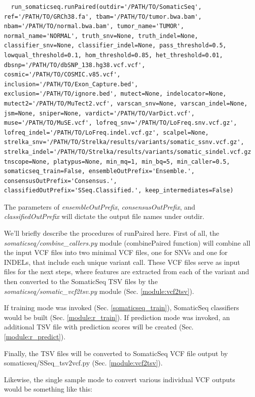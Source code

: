 \documentclass[10pt,letterpaper]{article}
\begin{document}
\begin{sloppypar}
\begin{lstlisting}
  run_somaticseq.runPaired(outdir='/PATH/TO/SomaticSeq', ref='/PATH/TO/GRCh38.fa', tbam='/PATH/TO/tumor.bwa.bam', nbam='/PATH/TO/normal.bwa.bam', tumor_name='TUMOR', normal_name='NORMAL', truth_snv=None, truth_indel=None, classifier_snv=None, classifier_indel=None, pass_threshold=0.5, lowqual_threshold=0.1, hom_threshold=0.85, het_threshold=0.01, dbsnp='/PATH/TO/dbSNP_138.hg38.vcf.vcf', cosmic='/PATH/TO/COSMIC.v85.vcf', inclusion='/PATH/TO/Exon_Capture.bed', exclusion='/PATH/TO/ignore.bed', mutect=None, indelocator=None, mutect2='/PATH/TO/MuTect2.vcf', varscan_snv=None, varscan_indel=None, jsm=None, sniper=None, vardict='/PATH/TO/VarDict.vcf', muse='/PATH/TO/MuSE.vcf', lofreq_snv='/PATH/TO/LoFreq.snv.vcf.gz', lofreq_indel='/PATH/TO/LoFreq.indel.vcf.gz', scalpel=None, strelka_snv='/PATH/TO/Strelka/results/variants/somatic_ssnv.vcf.gz', strelka_indel='/PATH/TO/Strelka/results/variants/somatic_sindel.vcf.gz', tnscope=None, platypus=None, min_mq=1, min_bq=5, min_caller=0.5, somaticseq_train=False, ensembleOutPrefix='Ensemble.', consensusOutPrefix='Consensus.', classifiedOutPrefix='SSeq.Classified.', keep_intermediates=False)
\end{lstlisting}

The parameters of \emph{ensembleOutPrefix}, \emph{consensusOutPrefix}, and \emph{classifiedOutPrefix} will dictate the output file names under outdir.


We'll briefly describe the procedures of runPaired here. First of all, the \emph{somaticseq/combine\_callers.py} module (combinePaired function) will combine all the input VCF files into two minimal VCF files, one for SNVs and one for INDELs, that include each unique variant call. These VCF files serve as input files for the next steps, where features are extracted from each of the variant and then converted to the SomaticSeq TSV files by the \emph{somaticseq/somatic\_vcf2tsv.py} module (Sec. \ref{module:vcf2tsv}).

If training mode was invoked (Sec. \ref{somaticseq_train}), SomaticSeq classifiers would be built (Sec. \ref{module:r_train}). If prediction mode was invoked, an additional TSV file with prediction scores will be created (Sec. \ref{module:r_predict}). 

Finally, the TSV files will be converted to SomaticSeq VCF file output by somaticseq/SSeq\_tsv2vcf.py (Sec. \ref{module:vcf2tsv}). 



Likewise, the single sample mode to convert various individual VCF outputs would be something like this:


\end{sloppypar}
\end{document}
